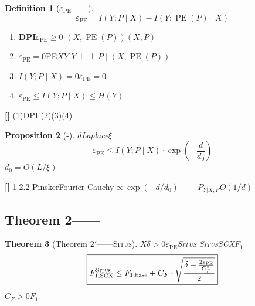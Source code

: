 \documentclass[11pt,a4paper]{article}
\newtheorem{theorem}{Theorem}[section]
\newtheorem{proposition}[theorem]{Proposition}
\newtheorem{definition}[theorem]{Definition}
\theoremstyle{remark}
\DeclareMathOperator{\PE}{PE}
\newcommand{\indep}{\perp\!\!\!\perp}
\newcommand{\Situs}{\textsc{Situs}}
\newcommand{\rigorous}{\textnormal{\textbf{[]}}}
\newcommand{\heuristic}{\textnormal{\textbf{[]}}}
\begin{document}
\begin{definition}[$\varepsilon_{\PE}$——]
\label{def:3.1}
\begin{equation}
    \boxed{
    \varepsilon_{\PE} = I(Y; P \mid X) - I(Y; \PE(P) \mid X)
    }
\end{equation}
\end{definition}

\textbf{}
\begin{enumerate}[label=(\arabic*)]
    \item \textbf{DPI}$\varepsilon_{\PE} \geq 0$
          $(X, \PE(P))$$(X, P)$
    \item \textbf{}$\varepsilon_{\PE} = 0$PE$X$$Y$
          \textbf{}$Y \indep P \mid (X, \PE(P))$
    \item \textbf{}$I(Y; P \mid X) = 0$$\varepsilon_{\PE} = 0$
    \item \textbf{}$\varepsilon_{\PE} \leq I(Y; P \mid X) \leq H(Y)$
\end{enumerate}

\rigorous{} \textbf{}(1)DPI
(2)(3)(4)

\begin{proposition}[-]
\label{prop:3.1}
$d$Laplace$\xi$
\begin{equation}
    \varepsilon_{\PE} \leq I(Y; P \mid X) \cdot \exp\!\left(-\frac{d}{d_0}\right)
\end{equation}
$d_0 = O(L/\xi)$
\end{proposition}

\heuristic{} \textbf{}1.2.2
PinskerFourier
Cauchy$\propto \exp(-d/d_0)$——
$P_{Y|X,P}$$O(1/d)$

\subsection{Theorem 2——}

\begin{theorem}[Theorem $2'$——\Situs{}]
\label{thm:2'}
$X$$\delta > 0$$\varepsilon_{\PE}$\Situs{}
\Situs{}SCX$F_1$
\begin{equation}
    \boxed{
    F_{1,\text{SCX}}^{\Situs} \leq F_{1,\text{base}}
    + C_F \cdot \sqrt{\frac{\delta + \frac{2\varepsilon_{\PE}}{C_F^2}}{2}}
    }
\end{equation}
$C_F > 0$$F_1$
\end{theorem}
\end{document}
